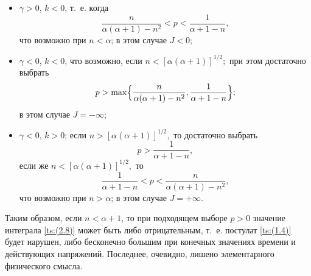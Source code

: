 \begin{itemize}
\item[1)] $\gamma>0$, $k<0$, т.~е. когда 
$$ \frac n{\alpha(\alpha+1)-n^2}<p< \frac 1{\alpha+1-n},$$ что возможно при $n<\alpha$; 
в этом случае $J<0$;

\item[2)] $\gamma<0$, $k<0$, что возможно, если $n<[\alpha(\alpha+1)]^{1/2};$ при этом достаточно выбрать 
$$
p>\max\Bigl\{ \frac n {\alpha(\alpha+1)-n^{2}}, \frac 1 {\alpha+1-n} \Bigr\};
$$ в этом случае $J=-\infty$;

\item[3)] $\gamma<0$, $k>0$; если 
$n>[\alpha(\alpha+1)]^{1/2},$ 
то достаточно выбрать $$p>\frac 1 {\alpha+1-n},$$ 
если же $n<[\alpha(\alpha+1)]^{1/2},$ то $$ \frac 1 {\alpha+1-n }<p< \frac n {\alpha(\alpha+1)-n^{2}},$$ что возможно при $n>\alpha$; в этом случае $J=+\infty$.

\end{itemize}


Таким образом, если $n<\alpha+1$, то при подходящем выборе $p>0$ значение интеграла \eqref{ts:(2.8)} может быть либо отрицательным, т.~е. постулат \eqref{ts:(1.4)} будет нарушен, либо бесконечно большим при конечных значениях времени и действующих напряжений. Последнее, очевидно, лишено элементарного физического смысла.


\RusRef


